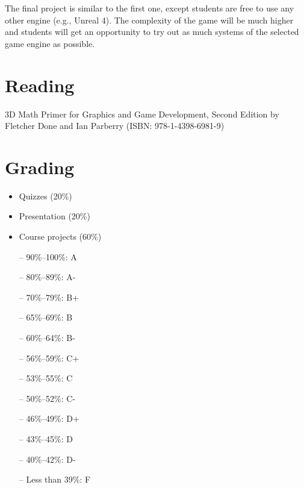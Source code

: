 \documentclass[12pt,a4paper,oneside]{article}
\begin{document}
        The final project is similar to the first one, except students are free
        to use any other engine (e.g., Unreal 4). The complexity of the game
        will be much higher and students will get an opportunity to try out as
        much systems of the selected game engine as possible.

    \section{Reading}

        3D Math Primer for Graphics and Game Development, Second Edition by Fletcher
        Done and Ian Parberry (ISBN: 978-1-4398-6981-9)

    \section{Grading}

        \begin{itemize}
            \item Quizzes (20\%)
            \item Presentation (20\%)
            \item Course projects (60\%)
        \end{itemize}

        \begin{itemize} \itemsep-10pt \parskip0pt 
            \item[--] 90\%--100\%: A\\
            \item[--] 80\%--89\%: A-\\
            \item[--] 70\%--79\%: B+\\
            \item[--] 65\%--69\%: B\\
            \item[--] 60\%--64\%: B-\\
            \item[--] 56\%--59\%: C+\\
            \item[--] 53\%--55\%: C\\
            \item[--] 50\%--52\%: C-\\
            \item[--] 46\%--49\%: D+\\
            \item[--] 43\%--45\%: D\\
            \item[--] 40\%--42\%: D-\\
            \item[--] Less than 39\%: F
        \end{itemize}
\end{document}
